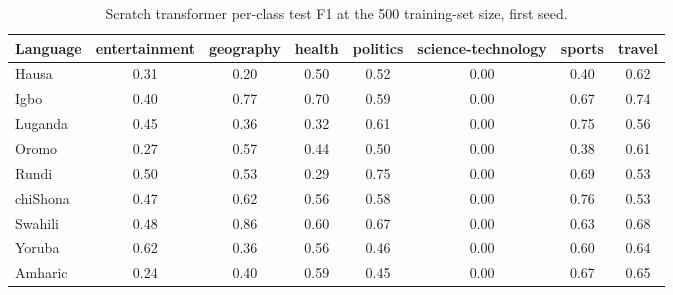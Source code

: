 \begin{table}[t]
\centering
\caption{Scratch transformer per-class test F1 at the 500 training-set size, first seed.}
\label{tab:scratch_per_class_f1_500}
\small
\begin{tabular}{lccccccc}
\toprule
Language & entertainment & geography & health & politics & science-technology & sports & travel \\
\midrule
Hausa & 0.31 & 0.20 & 0.50 & 0.52 & 0.00 & 0.40 & 0.62 \\
Igbo & 0.40 & 0.77 & 0.70 & 0.59 & 0.00 & 0.67 & 0.74 \\
Luganda & 0.45 & 0.36 & 0.32 & 0.61 & 0.00 & 0.75 & 0.56 \\
Oromo & 0.27 & 0.57 & 0.44 & 0.50 & 0.00 & 0.38 & 0.61 \\
Rundi & 0.50 & 0.53 & 0.29 & 0.75 & 0.00 & 0.69 & 0.53 \\
chiShona & 0.47 & 0.62 & 0.56 & 0.58 & 0.00 & 0.76 & 0.53 \\
Swahili & 0.48 & 0.86 & 0.60 & 0.67 & 0.00 & 0.63 & 0.68 \\
Yoruba & 0.62 & 0.36 & 0.56 & 0.46 & 0.00 & 0.60 & 0.64 \\
Amharic & 0.24 & 0.40 & 0.59 & 0.45 & 0.00 & 0.67 & 0.65 \\
\bottomrule
\end{tabular}
\end{table}